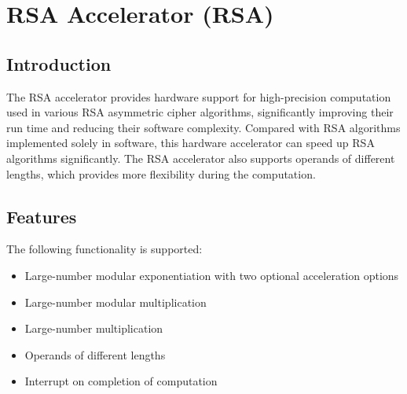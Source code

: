 \documentclass[main\_\_EN.tex]{subfiles}
\begin{document}

\ifglobal
\else
    {\let\clearpage\relax \listoftodos}
    {\let\clearpage\relax \listofdonetodos}
    \tableofcontents
\fi



\hypertarget{rsa}{}
\chapter{RSA Accelerator (RSA)}\label{mod:rsa}
\section{Introduction}

The RSA accelerator provides hardware support for high-precision computation used in various RSA asymmetric cipher algorithms, significantly improving their run time and reducing their software complexity. Compared with RSA algorithms implemented solely in software, this hardware accelerator can speed up RSA algorithms significantly. The RSA accelerator also supports operands of different lengths, which provides more flexibility during the computation.
\section{Features}

The following functionality is supported:

\begin{itemize}
    \item Large-number modular exponentiation with two optional acceleration options
    \item Large-number modular multiplication
    \item Large-number multiplication
    \item Operands of different lengths
    \item Interrupt on completion of computation
\end{itemize}
\end{document}
